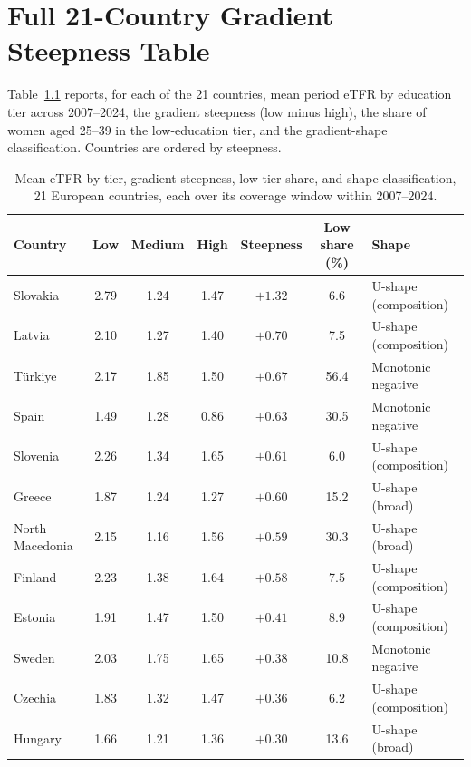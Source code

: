 \documentclass[12pt,a4paper]{report}
\begin{document}
\appendix

\chapter{Full 21-Country Gradient Steepness Table}

Table~\ref{tab:appA} reports, for each of the 21 countries, mean period eTFR by education tier
across 2007--2024, the gradient steepness (low minus high), the share of women aged 25--39 in the
low-education tier, and the gradient-shape classification. Countries are ordered by steepness.

\begin{table}[ht]
\centering
\caption{Mean eTFR by tier, gradient steepness, low-tier share, and shape classification, 21 European countries, each over its coverage window within 2007--2024.}
\label{tab:appA}
\small
\begin{tabular}{@{}lcccccl@{}}
\toprule
Country & Low & Medium & High & Steepness & Low share (\%) & Shape \\
\midrule
Slovakia        & 2.79 & 1.24 & 1.47 & $+1.32$ & 6.6  & U-shape (composition) \\
Latvia          & 2.10 & 1.27 & 1.40 & $+0.70$ & 7.5  & U-shape (composition) \\
Türkiye         & 2.17 & 1.85 & 1.50 & $+0.67$ & 56.4 & Monotonic negative \\
Spain           & 1.49 & 1.28 & 0.86 & $+0.63$ & 30.5 & Monotonic negative \\
Slovenia        & 2.26 & 1.34 & 1.65 & $+0.61$ & 6.0  & U-shape (composition) \\
Greece          & 1.87 & 1.24 & 1.27 & $+0.60$ & 15.2 & U-shape (broad) \\
North Macedonia & 2.15 & 1.16 & 1.56 & $+0.59$ & 30.3 & U-shape (broad) \\
Finland         & 2.23 & 1.38 & 1.64 & $+0.58$ & 7.5  & U-shape (composition) \\
Estonia         & 1.91 & 1.47 & 1.50 & $+0.41$ & 8.9  & U-shape (composition) \\
Sweden          & 2.03 & 1.75 & 1.65 & $+0.38$ & 10.8 & Monotonic negative \\
Czechia         & 1.83 & 1.32 & 1.47 & $+0.36$ & 6.2  & U-shape (composition) \\
Hungary         & 1.66 & 1.21 & 1.36 & $+0.30$ & 13.6 & U-shape (broad) \\

\end{tabular}
\end{table}
\end{document}
